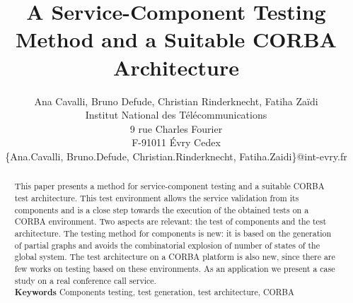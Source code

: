 \documentclass[10pt,twocolumn]{article}
\newcommand{\audio}{conference call\xspace}
\begin{document}
\title{A Service-Component Testing Method and a Suitable CORBA Architecture}
\author{Ana Cavalli, Bruno Defude, Christian Rinderknecht, Fatiha Zaïdi\\
Institut National des Télécommunications\\
9 rue Charles Fourier\\
F-91011 Évry Cedex\\
\{Ana.Cavalli, Bruno.Defude, Christian.Rinderknecht,
Fatiha.Zaidi\}@int-evry.fr}

\maketitle
\thispagestyle{empty}

\begin{abstract}
This paper presents a method for service-component testing and a
suitable CORBA test architecture. This test environment allows the
service validation from its components and is a close step towards the
execution of the obtained tests on a CORBA environment. Two aspects
are relevant: the test of components and the test architecture. The
testing method for components is new: it is based on the generation of
partial graphs and avoids the combinatorial explosion of number of
states of the global system. The test architecture on a CORBA platform
is also new, since there are few works on testing based on these
environments. As an application we present a case study on a real
\audio service.\\ {\bf Keywords} Components testing, test generation,
test architecture, CORBA
\end{abstract}






\nocite{*}




%
\end{document}
